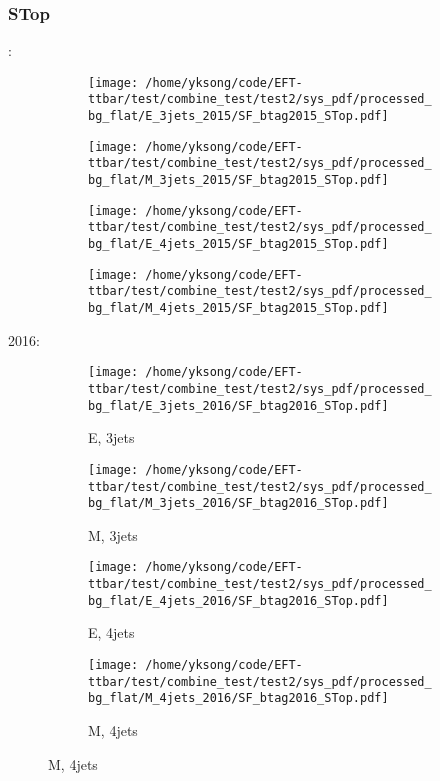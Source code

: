 \documentclass{beamer}
\begin{document}
\begin{frame}
\frametitle{STop}
\fontsize{5}{1}:
\begin{figure}
\centering
\begin{subfigure}[b]{0.24\textwidth}
\texttt{[image: /home/yksong/code/EFT-ttbar/test/combine\_test/test2/sys\_pdf/processed\_bg\_flat/E\_3jets\_2015/SF\_btag2015\_STop.pdf]}
\end{subfigure}
\begin{subfigure}[b]{0.24\textwidth}
\texttt{[image: /home/yksong/code/EFT-ttbar/test/combine\_test/test2/sys\_pdf/processed\_bg\_flat/M\_3jets\_2015/SF\_btag2015\_STop.pdf]}
\end{subfigure}
\begin{subfigure}[b]{0.24\textwidth}
\texttt{[image: /home/yksong/code/EFT-ttbar/test/combine\_test/test2/sys\_pdf/processed\_bg\_flat/E\_4jets\_2015/SF\_btag2015\_STop.pdf]}
\end{subfigure}
\begin{subfigure}[b]{0.24\textwidth}
\texttt{[image: /home/yksong/code/EFT-ttbar/test/combine\_test/test2/sys\_pdf/processed\_bg\_flat/M\_4jets\_2015/SF\_btag2015\_STop.pdf]}
\end{subfigure}
\end{figure}
2016:
\begin{figure}
\centering
\begin{subfigure}[b]{0.24\textwidth}
\texttt{[image: /home/yksong/code/EFT-ttbar/test/combine\_test/test2/sys\_pdf/processed\_bg\_flat/E\_3jets\_2016/SF\_btag2016\_STop.pdf]}
\captionsetup{font=tiny}
\caption{E, 3jets}
\end{subfigure}
\begin{subfigure}[b]{0.24\textwidth}
\texttt{[image: /home/yksong/code/EFT-ttbar/test/combine\_test/test2/sys\_pdf/processed\_bg\_flat/M\_3jets\_2016/SF\_btag2016\_STop.pdf]}
\captionsetup{font=tiny}
\caption{M, 3jets}
\end{subfigure}
\begin{subfigure}[b]{0.24\textwidth}
\texttt{[image: /home/yksong/code/EFT-ttbar/test/combine\_test/test2/sys\_pdf/processed\_bg\_flat/E\_4jets\_2016/SF\_btag2016\_STop.pdf]}
\captionsetup{font=tiny}
\caption{E, 4jets}
\end{subfigure}
\begin{subfigure}[b]{0.24\textwidth}
\texttt{[image: /home/yksong/code/EFT-ttbar/test/combine\_test/test2/sys\_pdf/processed\_bg\_flat/M\_4jets\_2016/SF\_btag2016\_STop.pdf]}
\captionsetup{font=tiny}
\caption{M, 4jets}
\end{subfigure}
\end{figure}
\end{frame}
\end{document}
